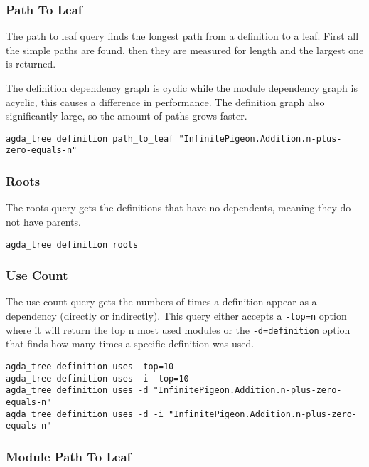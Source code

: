 \subsubsection{Path To Leaf}

The path to leaf query finds the longest path from a definition to a leaf.
First all the simple paths are found, then they are measured for length and the
largest one is returned.

The definition dependency graph is cyclic while the module dependency graph is
acyclic, this causes a difference in performance.  The definition graph also
significantly large, so the amount of paths grows faster.

\begin{lstlisting}
agda_tree definition path_to_leaf "InfinitePigeon.Addition.n-plus-zero-equals-n"
\end{lstlisting}

\subsubsection{Roots}

The roots query gets the definitions that have no dependents, meaning they do
not have parents.

\begin{lstlisting}
agda_tree definition roots
\end{lstlisting}

\subsubsection{Use Count}

The use count query gets the numbers of times a definition appear as a
dependency (directly or indirectly). This query either accepts a
\texttt{-top=n} option where it will return the top n most used modules or the
\texttt{-d=definition} option that finds how many times a specific definition
was used.

\begin{lstlisting}
agda_tree definition uses -top=10
agda_tree definition uses -i -top=10
agda_tree definition uses -d "InfinitePigeon.Addition.n-plus-zero-equals-n"
agda_tree definition uses -d -i "InfinitePigeon.Addition.n-plus-zero-equals-n"
\end{lstlisting}

\subsubsection{Module Path To Leaf}

